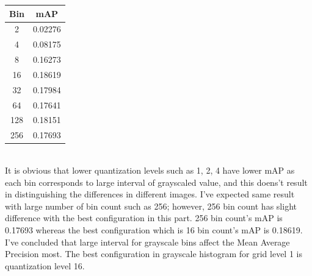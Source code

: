 \documentclass[12pt]{article}
\begin{document}
\begin{minipage}{\textwidth}
	\begin{minipage}{0.49\textwidth}
		\centering
		\captionsetup{width=.9\textwidth}
	 \end{minipage}
	 \hfill
	\begin{minipage}{0.49\textwidth}
		\centering
		\begin{tabular}{ | c | c | }
		  \hline			
		  \bf Bin & \bf mAP \\
		  \hline		
		  2 & 0.02276 \\
		  \hline	
		  4 & 0.08175 \\
		  \hline	
		  8 & 0.16273 \\
		  \hline	
		  16 & 0.18619 \\
		  \hline	
		  32 & 0.17984 \\
		  \hline	
		  64 & 0.17641 \\
		  \hline	
		  128 & 0.18151 \\
		  \hline	
		  256 & 0.17693 \\
		  \hline
		\end{tabular}
		\captionsetup{width=.8\textwidth}
	\end{minipage}
\end{minipage} \\

\qquad It is obvious that lower quantization levels such as 1, 2, 4 have lower mAP as each bin corresponds to large interval of grayscaled value, and this doens't result in distinguishing the differences in different images. I've expected same result with large number of bin count such as 256; however, 256 bin count has slight difference with the best configuration in this part. 256 bin count's mAP is 0.17693 whereas the best configuration which is 16 bin count's mAP is 0.18619. I've concluded that large interval for grayscale bins affect the Mean Average Precision most. The best configuration in grayscale histogram for grid level 1 is quantization level 16.
\end{document}
